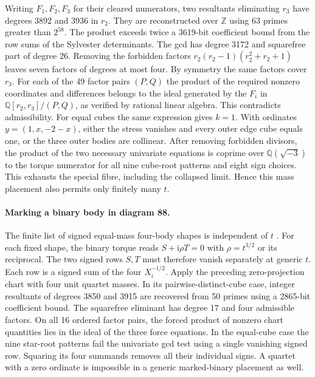 \documentclass[11pt]{article}
\newcommand{\Q}{\mathbb Q}
\begin{document}
Writing $F_1,F_2,F_3$ for their cleared numerators, two resultants eliminating $r_3$ have degrees 3892 and 3936 in $r_2$. They are reconstructed over $\mathbb Z$ using 63 primes greater than $2^{58}$. The product exceeds twice a 3619-bit coefficient bound from the row sums of the Sylvester determinants. The gcd has degree 3172 and squarefree part of degree 26. Removing the forbidden factors $r_2(r_2-1)(r_2^2+r_2+1)$ leaves seven factors of degrees at most four. By symmetry the same factors cover $r_3$. For each of the 49 factor pairs $(P,Q)$ the product of the required nonzero coordinates and differences belongs to the ideal generated by the $F_i$ in $\Q[r_2,r_3]/(P,Q)$, as verified by rational linear algebra. This contradicts admissibility. For equal cubes the same expression gives $k=1$. With ordinates $y=(1,x,-2-x)$, either the stress vanishes and every outer edge cube equals one, or the three outer bodies are collinear. After removing forbidden divisors, the product of the two necessary univariate equations is coprime over $\Q(\sqrt{-3})$ to the torque numerator for all nine cube-root patterns and eight sign choices. This exhausts the special fibre, including the collapsed limit. Hence this mass placement also permits only finitely many $t$.

\paragraph{Marking a binary body in diagram 88.}
The finite list of signed equal-mass four-body shapes is independent of $t$ \cite{Previous}. For each fixed shape, the binary torque reads $S+\mathrm i\rho T=0$ with $\rho=t^{3/2}$ or its reciprocal. The two signed rows $S,T$ must therefore vanish separately at generic $t$. Each row is a signed sum of the four $X_i^{-1/2}$. Apply the preceding zero-projection chart with four unit quartet masses. In its pairwise-distinct-cube case, integer resultants of degrees 3850 and 3915 are recovered from 50 primes using a 2865-bit coefficient bound. The squarefree eliminant has degree 17 and four admissible factors. On all 16 ordered factor pairs, the forced product of nonzero chart quantities lies in the ideal of the three force equations. In the equal-cube case the nine star-root patterns fail the univariate gcd test using a single vanishing signed row. Squaring its four summands removes all their individual signs. A quartet with a zero ordinate is impossible in a generic marked-binary placement as well.
\end{document}
